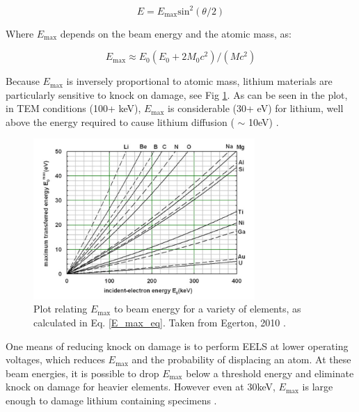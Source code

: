 \begin{equation}
E = E_{\mathrm{max}} \mathrm{sin}^2 (\theta/2)
\end{equation}

Where $E_{\mathrm{max}}$ depends on the beam energy and the atomic mass, as:

\begin{equation}
E_{\mathrm{max}} \approx E_{\mathrm{0}}(E_{\mathrm{0}} + 2M_{\mathrm{0}}c^2) / (Mc^2)
\label{E_max_eq}
\end{equation}
 
Because $E_{\mathrm{max}}$ is inversely proportional to atomic mass, lithium materials are particularly sensitive to knock on damage, see Fig \ref{E_max_plot}.  As can be seen in the plot, in TEM conditions (100+ keV), $E_{\mathrm{max}}$ is considerable (30+ eV) for lithium, well above the energy required to cause lithium diffusion ( $\sim$ 10eV) \cite{van_der_ven_first-principles_2001}.
\begin{figure}
\centering
\includegraphics[width=0.75\textwidth]{./Images/beam_energy_vs_max_transfer.png}
\caption{Plot relating $E_{\mathrm{max}}$ to beam energy for a variety of elements, as calculated in Eq. \ref{E_max_eq}.  Taken from Egerton, 2010 \cite{egerton_basic_2010}.}
\label{E_max_plot}
\end{figure}



One means of reducing knock on damage is to perform EELS at lower operating voltages, which reduces $E_{\mathrm{max}}$ and the probability of displacing an atom. At these beam energies, it is possible to drop $E_{\mathrm{max}}$ below a threshold energy and eliminate knock on damage for heavier elements. However even at 30keV, $E_{\mathrm{max}}$ is large enough to damage lithium containing specimens \cite{van_der_ven_first-principles_2001}.  


